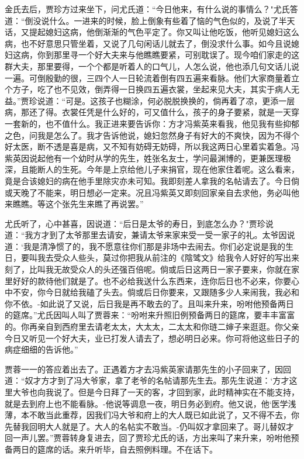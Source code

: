 金氏去后，贾珍方过来坐下，问尤氏道：“今日他来，有什么说的事情么？"尤氏答道：“倒没说什么。一进来的时候，脸上倒象有些着了恼的气色似的，及说了半天话，又提起媳妇这病，他倒渐渐的气色平定了。你又叫让他吃饭，他听见媳妇这么病，也不好意思只管坐着，又说了几句闲话儿就去了，倒没求什么事。如今且说媳妇这病，你到那里寻一个好大夫来与他瞧瞧要紧，可别耽误了。现今咱们家走的这群大夫，那里要得，一个个都是听着人的口气儿，人怎么说，他也添几句文话儿说一遍。可倒殷勤的很，三四个人一日轮流着倒有四五遍来看脉。他们大家商量着立个方子，吃了也不见效，倒弄得一日换四五遍衣裳，坐起来见大夫，其实于病人无益。”贾珍说道：“可是。这孩子也糊涂，何必脱脱换换的，倘再着了凉，更添一层病，那还了得。衣裳任凭是什么好的，可又值什么，孩子的身子要紧，就是一天穿一套新的，也不值什么。我正进来要告诉你：方才冯紫英来看我，他见我有些抑郁之色，问我是怎么了。我才告诉他说，媳妇忽然身子有好大的不爽快，因为不得个好太医，断不透是喜是病，又不知有妨碍无妨碍，所以我这两日心里着实着急。冯紫英因说起他有一个幼时从学的先生，姓张名友士，学问最渊博的，更兼医理极深，且能断人的生死。今年是上京给他儿子来捐官，现在他家住着呢。这么看来，竟是合该媳妇的病在他手里除灾亦未可知。我即刻差人拿我的名帖请去了。今日倘或天晚了不能来，明日想必一定来。况且冯紫英又即刻回家亲自去求他，务必叫他来瞧瞧。等这个张先生来瞧了再说罢。”

尤氏听了，心中甚喜，因说道：“后日是太爷的寿日，到底怎么办？"贾珍说道：“我方才到了太爷那里去请安，兼请太爷来家来受一受一家子的礼。太爷因说道：`我是清净惯了的，我不愿意往你们那是非场中去闹去。你们必定说是我的生日，要叫我去受众人些头，莫过你把我从前注的《陰骘文》给我令人好好的写出来刻了，比叫我无故受众人的头还强百倍呢。倘或后日这两日一家子要来，你就在家里好好的款待他们就是了。也不必给我送什么东西来，连你后日也不必来，你要心中不安，你今日就给我磕了头去。倘或后日你要来，又跟随多少人来闹我，我必和你不依。-如此说了又说，后日我是再不敢去的了。且叫来升来，吩咐他预备两日的筵席。”尤氏因叫人叫了贾蓉来：“吩咐来升照旧例预备两日的筵席，要丰丰富富的。你再亲自到西府里去请老太太，大太太，二太太和你琏二婶子来逛逛。你父亲今日又听见一个好大夫，业已打发人请去了，想必明日必来。你可将他这些日子的病症细细的告诉他。”

贾蓉一一的答应着出去了。正遇着方才去冯紫英家请那先生的小子回来了，因回道：“奴才方才到了冯大爷家，拿了老爷的名帖请那先生去。那先生说道：`方才这里大爷也向我说了。但是今日拜了一天的客，才回到家，此时精神实在不能支持，就是去到府上也不能看脉。-他说等调息一夜，明日务必到府。他又说，他`医学浅薄，本不敢当此重荐，因我们冯大爷和府上的大人既已如此说了，又不得不去，你先替我回明大人就是了。大人的名帖实不敢当。-仍叫奴才拿回来了。哥儿替奴才回一声儿罢。”贾蓉转身复进去，回了贾珍尤氏的话，方出来叫了来升来，吩咐他预备两日的筵席的话。来升听毕，自去照例料理。不在话下。

